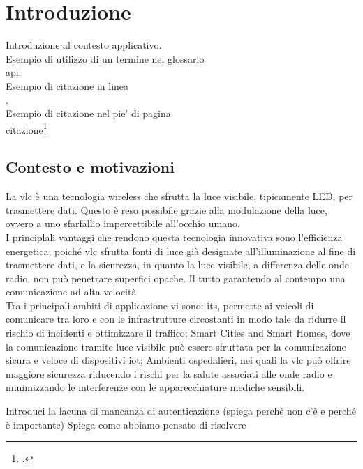 \chapter{Introduzione}
\label{cap:introduzione}

Introduzione al contesto applicativo.\\

\noindent Esempio di utilizzo di un termine nel glossario \\
\gls{api}. \\

\noindent Esempio di citazione in linea \\
\cite{site:agile-manifesto}. \\

\noindent Esempio di citazione nel pie' di pagina \\
citazione\footcite{womak:lean-thinking} \\

\section{Contesto e motivazioni}
La \gls{vlc} è una tecnologia wireless che sfrutta la luce visibile, tipicamente LED, per trasmettere dati. Questo è reso possibile grazie alla modulazione della luce, ovvero a uno sfarfallio impercettibile all'occhio umano. \\
I principlali vantaggi che rendono questa tecnologia innovativa sono l'efficienza energetica, poiché \gls{vlc} sfrutta fonti di luce già designate all'illuminazione al fine di trasmettere dati, e la sicurezza, in quanto la luce visibile, a differenza delle onde radio, non può penetrare superfici opache. Il tutto garantendo al contempo una comunicazione ad alta velocità.\\
Tra i principali ambiti di applicazione vi sono: \gls{its}, permette ai veicoli di comunicare tra loro e con le infrastrutture circostanti in modo tale da ridurre il rischio di incidenti e ottimizzare il traffico; Smart Cities and Smart Homes, dove la comunicazione tramite luce visibile può essere sfruttata per la comunicazione sicura e veloce di dispositivi \gls{iot}; Ambienti ospedalieri, nei quali la \gls{vlc} può offrire maggiore sicurezza riducendo i rischi per la salute associati alle onde radio e minimizzando le interferenze con le apparecchiature mediche sensibili.

Introduci la lacuna di mancanza di autenticazione (spiega perché non c'è e perché è importante)
Spiega come abbiamo pensato di risolvere

